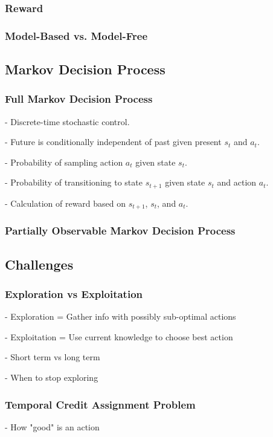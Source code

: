 \documentclass{jfm}
\begin{document}
\subsubsection{Reward}
\subsubsection{Model-Based vs. Model-Free}

\subsection{Markov Decision Process}
\subsubsection{Full Markov Decision Process}
- Discrete-time stochastic control.

- Future is conditionally independent of past given present $s_t$ and $a_t$.

- Probability of sampling action $a_t$ given state $s_t$.

- Probability of transitioning to state $s_{t+1}$ given state $s_t$ and action $a_t$.

- Calculation of reward based on $s_{t+1}$, $s_t$, and $a_t$.

\subsubsection{Partially Observable Markov Decision Process}

\subsection{Challenges}
 \subsubsection{Exploration vs Exploitation}
- Exploration = Gather info with possibly sub-optimal actions

- Exploitation = Use current knowledge to choose best action

- Short term vs long term

- When to stop exploring

\subsubsection{Temporal Credit Assignment Problem}
- How "good" is an action
\end{document}
